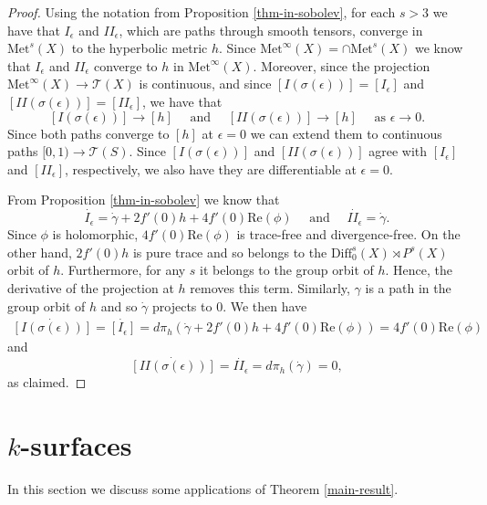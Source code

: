 \documentclass{amsart}
\newcommand{\two}{I\!\!I}
\begin{document}
\begin{proof}
Using the notation from  Proposition \ref{thm-in-sobolev}, for each $s > 3$ we have that $I_\epsilon$ and $\two_\epsilon$, which are paths through smooth tensors, converge in $\mathrm{Met}^s(X)$ to the hyperbolic metric $h$. 
Since $\mathrm{Met}^\infty(X)  = \cap \mathrm{Met}^s(X)$ we know that $I_\epsilon$ and $\two_\epsilon$ converge to $h$ in $\mathrm{Met}^\infty(X)$. 
Moreover, since the projection $\mathrm{Met}^\infty(X) \to \mathcal{T}(X)$ is continuous, and since $[I(\sigma(\epsilon))] = [I_\epsilon]$ and $[\two(\sigma(\epsilon))] = [\two_\epsilon]$, we have that
\[
[I(\sigma(\epsilon))] \to [h]
\quad \text{ and } \quad 
[\two(\sigma(\epsilon))] \to [h]
\quad \text{ as } \epsilon \to 0.
\]
Since both paths converge to $[h]$ at $\epsilon = 0$ we can extend them to continuous paths $[0,1) \to \mathcal{T}(S)$. 
Since $[I(\sigma(\epsilon))]$ and  $[\two(\sigma(\epsilon))]$ agree with $[I_\epsilon]$ and $[\two_\epsilon]$, respectively, we also have they are differentiable at $\epsilon = 0$.

From Proposition \ref{thm-in-sobolev} we know that 
\[
\dot{I_\epsilon}  = \dot{\gamma} + 2 f'(0) h + 4 f'(0) \mathrm{Re}(\phi) \quad \text{ and } \quad \dot{\two_\epsilon} = \dot{\gamma}.
\]
Since $\phi$ is holomorphic, $4 f'(0) \mathrm{Re}(\phi)$ is trace-free and divergence-free. 
On the other hand, $2 f'(0) h$ is pure trace and so belongs to the $\mathrm{Diff}_0^s(X) \rtimes P^s(X)$ orbit of $h$. Furthermore, for any $s$ it belongs to the group orbit of $h$. 
Hence, the derivative of the projection at $h$ removes this term.
Similarly, $\gamma$ is a path in the group orbit of $h$ and so $\dot{\gamma}$ projects to 0. 
We then have
\begin{align*}
\dot{[I(\sigma(\epsilon))]}
= \dot{[I_\epsilon]}
= d \pi_h (\dot{\gamma} + 2 f'(0) h + 4 f'(0) \mathrm{Re}(\phi)) 
= 4 f'(0) \mathrm{Re}(\phi)
\end{align*}
and
\[
\dot{[\two(\sigma(\epsilon))]} = \dot{\two_\epsilon} = d \pi_h (\dot{\gamma}) = 0,
\]
as claimed.
\end{proof}


\section{$k$-surfaces}




In this section we discuss some applications of Theorem \ref{main-result}. 
\end{document}
